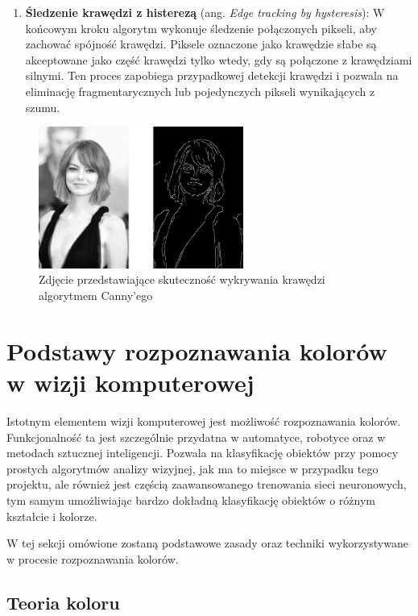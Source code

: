 \begin{enumerate}
    \item \textbf{Śledzenie krawędzi z histerezą} (ang. \textit{Edge tracking by hysteresis}): W końcowym kroku algorytm wykonuje śledzenie połączonych pikseli, aby zachować spójność krawędzi. Piksele oznaczone jako krawędzie słabe są akceptowane jako część krawędzi tylko wtedy, gdy są połączone z krawędziami silnymi. Ten proces zapobiega przypadkowej detekcji krawędzi i pozwala na eliminację fragmentarycznych lub pojedynczych pikseli wynikających z szumu.
\end{enumerate}


\begin{figure}[h!]
    \centering
    \includegraphics[width=0.6\textwidth]{./graf/canny-edge.png}
    \caption{Zdjęcie przedstawiające skuteczność wykrywania krawędzi algorytmem Canny'ego}
\end{figure}

\clearpage

\section{Podstawy rozpoznawania kolorów w wizji komputerowej}

Istotnym elementem wizji komputerowej jest możliwość rozpoznawania kolorów. Funkcjonalność ta jest szczególnie przydatna w automatyce, robotyce oraz w metodach sztucznej inteligencji. Pozwala na klasyfikację obiektów przy pomocy prostych algorytmów analizy wizyjnej, jak ma to miejsce w przypadku tego projektu, ale również jest częścią zaawansowanego trenowania sieci neuronowych, tym samym umożliwiając bardzo dokładną klasyfikację obiektów o różnym kształcie i kolorze. 

W tej sekcji omówione zostaną podstawowe zasady oraz techniki wykorzystywane w procesie rozpoznawania kolorów.


\subsection{Teoria koloru}

